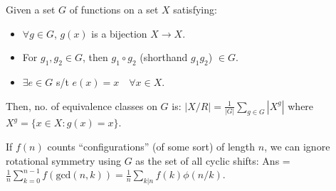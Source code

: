 Given a set $G$ of functions on a set $X$ satisfying:
\begin{itemize}
    \item $\forall g \in G$, $g(x)$ is a bijection $X \to X$.
    \item For $g_1, g_2 \in G$, then $g_1 \circ g_2$ (shorthand $g_1 g_2$) $\in G$.
    \item $\exists e \in G$ s/t $e(x) = x \quad \forall x \in X$.
\end{itemize}
Then, no. of equivalence classes on $G$ is: 
$\displaystyle 
|X / R| = \frac{1}{|G|}\sum _{{g\in G}}|X^{g}|$ where $X^{g} = \{ x \in X: g(x) = x \}.$

If $f(n)$ counts ``configurations'' (of some sort) of length $n$, we can ignore rotational symmetry using $G$ as the set of all cyclic shifts:
Ans = $\displaystyle 
\frac 1 n \sum_{k=0}^{n-1}{f(\text{gcd}(n, k))} = \frac 1 n \sum_{k|n}{f(k)\phi(n/k)}.$